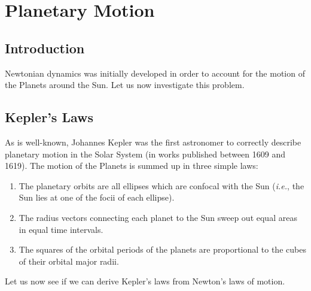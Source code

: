 \chapter{Planetary Motion}\label{skepler}
\section{Introduction}
Newtonian dynamics was initially developed in order  to account for the motion of the Planets around the Sun. Let us now investigate
this problem.

\section{Kepler's Laws}
As is well-known, Johannes Kepler was the first astronomer to correctly describe planetary motion in the Solar System
(in works published between 1609 and 1619). The motion of the Planets is  summed up
in three simple laws:
\begin{enumerate}
\item The planetary orbits are all ellipses which are confocal with the Sun
({\em i.e.}, the Sun lies at one of the focii of each ellipse).
\item The radius vectors connecting each planet to the Sun sweep out  equal areas in  equal time intervals.
\item The squares of the orbital periods of the planets are proportional to
the cubes of their orbital  major radii.
\end{enumerate} 
Let us now see if we can derive Kepler's laws from Newton's laws of
motion.

